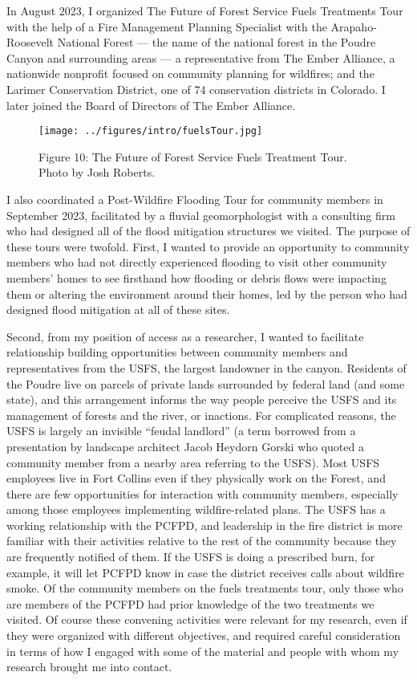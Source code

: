 \documentclass[
]{article}
\begin{document}
In August 2023, I organized The Future of Forest Service Fuels Treatments Tour with the help of a Fire Management Planning Specialist with the Arapaho-Roosevelt National Forest --- the name of the national forest in the Poudre Canyon and surrounding areas --- a representative from The Ember Alliance, a nationwide nonprofit focused on community planning for wildfires; and the Larimer Conservation District, one of 74 conservation districts in Colorado. I later joined the Board of Directors of The Ember Alliance.

\begin{figure}
\centering
\texttt{[image: ../figures/intro/fuelsTour.jpg]}
\caption{Figure 10: The Future of Forest Service Fuels Treatment Tour. Photo by Josh Roberts.}
\end{figure}

I also coordinated a Post-Wildfire Flooding Tour for community members in September 2023, facilitated by a fluvial geomorphologist with a consulting firm who had designed all of the flood mitigation structures we visited. The purpose of these tours were twofold. First, I wanted to provide an opportunity to community members who had not directly experienced flooding to visit other community members' homes to see firsthand how flooding or debris flows were impacting them or altering the environment around their homes, led by the person who had designed flood mitigation at all of these sites.

Second, from my position of access as a researcher, I wanted to facilitate relationship building opportunities between community members and representatives from the USFS, the largest landowner in the canyon. Residents of the Poudre live on parcels of private lands surrounded by federal land (and some state), and this arrangement informs the way people perceive the USFS and its management of forests and the river, or inactions. For complicated reasons, the USFS is largely an invisible ``feudal landlord'' (a term borrowed from a presentation by landscape architect Jacob Heydorn Gorski who quoted a community member from a nearby area referring to the USFS). Most USFS employees live in Fort Collins even if they physically work on the Forest, and there are few opportunities for interaction with community members, especially among those employees implementing wildfire-related plans. The USFS has a working relationship with the PCFPD, and leadership in the fire district is more familiar with their activities relative to the rest of the community because they are frequently notified of them. If the USFS is doing a prescribed burn, for example, it will let PCFPD know in case the district receives calls about wildfire smoke. Of the community members on the fuels treatments tour, only those who are members of the PCFPD had prior knowledge of the two treatments we visited. Of course these convening activities were relevant for my research, even if they were organized with different objectives, and required careful consideration in terms of how I engaged with some of the material and people with whom my research brought me into contact.
\end{document}
